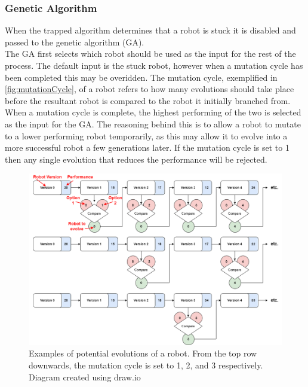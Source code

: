 \documentclass{article}
\begin{document}
\subsubsection{Genetic Algorithm}
\label{sec:GA Imp}
When the trapped algorithm determines that a robot is stuck it is disabled and passed to the genetic algorithm (GA).\\

The GA first selects which robot should be used as the input for the rest of the process. The default input is the stuck robot, however when a mutation cycle has been completed this may be overidden. The mutation cycle, exemplified in \autoref{fig:mutationCycle}, of a robot refers to how many evolutions should take place before the resultant robot is compared to the robot it initially branched from. When a mutation cycle is complete, the highest performing of the two is selected as the input for the GA. The reasoning behind this is to allow a robot to mutate to a lower performing robot temporarily, as this may allow it to evolve into a more successful robot a few generations later. If the mutation cycle is set to 1 then any single evolution that reduces the performance will be rejected.\\
\begin{figure}[H]
\centering
\includegraphics[scale=0.4]{mutationCycle}
\caption{Examples of potential evolutions of a robot. From the top row downwards, the mutation cycle is set to 1, 2, and 3 respectively. Diagram created using draw.io \citep{drawio}}
\label{fig:mutationCycle}
\end{figure}
\end{document}
